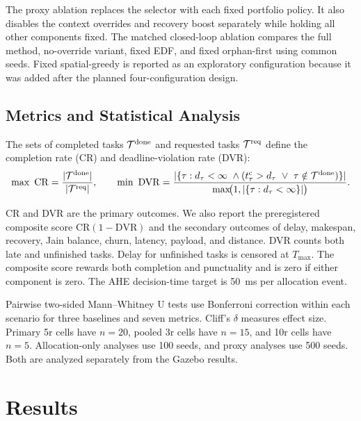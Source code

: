\documentclass[10pt,letterpaper,onecolumn]{IEEEtran}
\begin{document}
The proxy ablation replaces the selector with each fixed portfolio policy. It
also disables the context overrides and recovery boost separately while
holding all other components fixed. The matched closed-loop ablation compares
the full method, no-override variant, fixed EDF, and fixed orphan-first using
common seeds. Fixed spatial-greedy is reported as an exploratory configuration
because it was added after the planned four-configuration design.

\subsection{Metrics and Statistical Analysis}
\label{sec:metrics}

The sets of completed tasks $\mathcal T^{\rm done}$ and requested tasks
$\mathcal T^{\rm req}$ define the completion rate (CR) and deadline-violation
rate (DVR):
\begin{equation}
  \max\ \mathrm{CR}=
  \frac{|\mathcal{T}^{\rm done}|}{|\mathcal{T}^{\rm req}|},
  \qquad
  \min\ \mathrm{DVR}=
  \frac{|\{\tau:d_\tau<\infty\ \wedge
  (t_\tau^{\rm c}>d_\tau\ \vee\ \tau\notin\mathcal{T}^{\rm done})\}|}
  {\max\!\bigl(1,|\{\tau:d_\tau<\infty\}|\bigr)}.
  \label{eq:primary-outcomes}
\end{equation}

CR and DVR are the primary outcomes. We also report the preregistered composite
score $\mathrm{CR}(1-\mathrm{DVR})$ and the secondary outcomes of delay,
makespan, recovery, Jain balance, churn, latency, payload, and distance. DVR
counts both late and unfinished tasks. Delay for unfinished tasks is censored
at $T_{\max}$. The composite score rewards both completion and punctuality and
is zero if either component is zero. The AHE decision-time target is 50~ms per
allocation event.

Pairwise two-sided Mann--Whitney U tests use Bonferroni correction within each
scenario for three baselines and seven metrics. Cliff's $\delta$ measures
effect size. Primary 5r cells have $n=20$, pooled 3r cells have $n=15$, and 10r
cells have $n=5$. Allocation-only analyses use 100 seeds, and proxy analyses
use 500 seeds. Both are analyzed separately from the Gazebo results.

\section{Results}
\label{sec:results}
\end{document}
